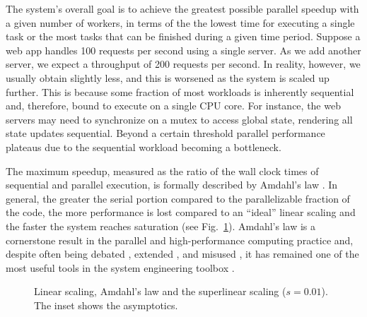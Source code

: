 The system's overall goal is to achieve the greatest possible parallel speedup with a given number of workers, in terms of the the lowest time for executing a single task or the most tasks that can be finished during a given time period.  Suppose a web app handles 100 requests per second using a single server. As we add another server, we expect a throughput of 200 requests per second. In reality, however, we usually obtain slightly less, and this is worsened as the system is scaled up further. This is because some fraction of most workloads is inherently sequential and, therefore, bound to execute on a single CPU core. For instance, the web servers may need to synchronize on a mutex to access global state, rendering all state updates sequential.  Beyond a certain threshold parallel performance plateaus due to the sequential workload becoming a bottleneck.

The maximum speedup, measured as the ratio of the wall clock times of sequential and parallel execution, is formally described by Amdahl's law \cite{10.1145/1465482.1465560}. In general, the greater the serial portion compared to the parallelizable fraction of the code, the more performance is lost compared to an ``ideal'' linear scaling and the faster the system reaches saturation (see Fig.~\ref{fig:amdahl}). Amdahl's law is a cornerstone result in the parallel and high-performance computing practice and, despite often being debated \cite{10.1145/42411.42415}, extended \cite{4563876, 6280307,1580395,406581,6163449}, and misused \cite{10.5555/775339.775386}, it has remained one of the most useful tools in the system engineering toolbox \cite{10.5555/1951599}.

\begin{figure}[t]
  \centering
  \begin{small}
  
\end{small}
  \caption{Linear scaling, Amdahl's law and the superlinear scaling ($s=0.01$). The inset shows the asymptotics.}
  \label{fig:amdahl}
\end{figure}

